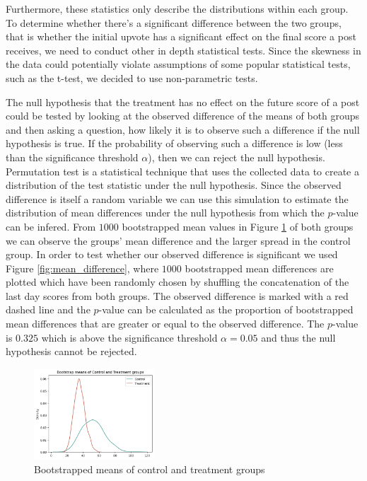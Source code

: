 \documentclass[fleqn,12pt]{article}
\begin{document}
Furthermore, these statistics only describe the distributions 
within each group. To determine whether there's a significant 
difference between the two groups, that is whether the 
initial upvote has a significant effect on the final score a post 
receives, we need to conduct other in depth statistical tests.
Since the skewness in the data could potentially violate assumptions
of some popular statistical tests, such as the t-test, we decided to use
non-parametric tests.

The null hypothesis
that the treatment has no effect on the future score of a post
could be tested by looking at the observed difference of the means of both groups
and then asking a question, how likely it is to observe such a difference
if the null hypothesis is true. If the probability of observing such a difference
is low (less than the significance threshold $\alpha$), then we can reject the null hypothesis.
Permutation test is a statistical technique that uses the collected data to create 
a distribution of the test statistic under the null hypothesis. Since
the observed difference is itself a random variable we can use this simulation
to estimate the distribution of mean differences under the null hypothesis from which the $p$-value can be infered. 
From $1000$ bootstrapped mean values in Figure \ref{fig:bootstrap_both_means} of both groups we can observe the groups' mean difference
and the larger spread in the control group. In order to test
whether our observed difference is significant we used Figure \ref{fig:mean_difference},
where $1000$ bootstrapped mean differences are plotted which have been randomly chosen 
by shuffling the concatenation of the last day scores from both groups. The observed difference is marked
with a red dashed line and the $p$-value can be calculated as the proportion of bootstrapped mean differences
that are greater or equal to the observed difference. The $p$-value is $0.325$ which is above
the significance threshold $\alpha = 0.05$ and thus the null hypothesis cannot be rejected.


\begin{figure}[h]
  \centering
  \includegraphics[width=0.4\textwidth]{figures/both_means.png}
  \caption{Bootstrapped means of control and treatment groups}
  \label{fig:bootstrap_both_means}
\end{figure}
\end{document}
